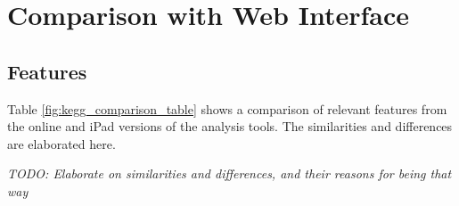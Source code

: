 \section{Comparison with \pathcasekegg Web Interface}
\label{sect:kegg_comparison}

\subsection{Features}
\label{sect:kegg_comparison_features}

Table \ref{fig:kegg_comparison_table} shows a comparison of relevant features
from the online and iPad versions of the \pathcasekegg analysis tools. The
similarities and differences are elaborated here.

\emph{TODO: Elaborate on similarities and differences, and their reasons for
being that way}

